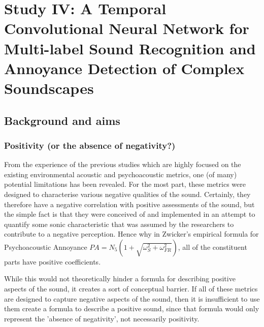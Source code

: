 \documentclass[oneside,fontsize=12pt,titlepage]{scrbook}
\begin{document}






 



 \newpage
 \chapter[Study IV: DeLTA]{Study IV: A Temporal Convolutional Neural Network for Multi-label Sound Recognition and Annoyance Detection of Complex Soundscapes}

\section*{Background and aims}

 \subsection*{Positivity (or the absence of negativity?)}
       From the experience of the previous studies which are highly focused on the existing environmental acoustic and psychoacoustic metrics, one (of many) potential limitations has been revealed. For the most part, these metrics were designed to characterise various negative qualities of the sound. Certainly, they therefore have a negative correlation with positive assessments of the sound, but the simple fact is that they were conceived of and implemented in an attempt to quantify some sonic characteristic that was assumed by the researchers to contribute to a negative perception. Hence why in Zwicker's empirical formula for Psychoacoustic Annoyance \citep{PsychoacousticsfactsmodelsZwicker} $PA = N_5 (1 + \sqrt{\omega^2_S + \omega^2_{FR}})$, all of the constituent parts have positive coefficients.

       While this would not theoretically hinder a formula for describing positive aspects of the sound, it creates a sort of conceptual barrier. If all of these metrics are designed to capture negative aspects of the sound, then it is insufficient to use them create a formula to describe a positive sound, since that formula would only represent the 'absence of negativity', not necessarily positivity.
\end{document}
